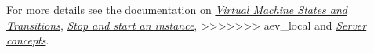 For more details see the documentation on \href{https://docs.openstack.org/nova/pike/reference/vm-states.html}{\emph{Virtual Machine States and Transitions}}, \href{https://docs.openstack.org/mitaka/user-guide/cli_stop_and_start_an_instance.html}{\emph{Stop and start an instance}},
>>>>>>> aev_local
and \href{https://developer.openstack.org/api-guide/compute/server_concepts.html}{\emph{Server concepts}}.

